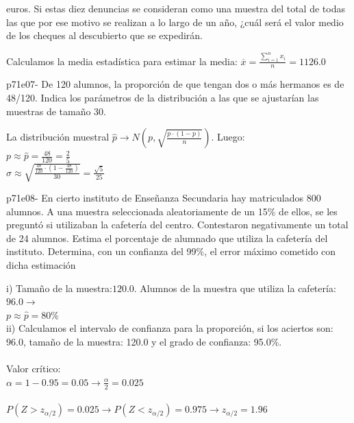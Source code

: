 \documentclass[spanish, 11pt]{exam}
\begin{document}
\begin{questions}
euros. Si estas diez denuncias se consideran como una muestra del total de todas las que por ese motivo se
realizan a lo largo de un año, ¿cuál será el valor medio de los cheques al descubierto que se expedirán. \begin{solution}   Calculamos la media estadística para estimar la media: $\overline{x}=\frac{{\sum_{i=1}^n x_i }}{n} =1126.0$ \\   \end{solution}\question p71e07- De 120 alumnos, la proporción de que tengan dos o más hermanos es de 48/120. Indica los parámetros de la
distribución a las que se ajustarían las muestras de tamaño 30. \begin{solution}   La distribución muestral $\widehat{p} \rightarrow N \left ( p , \sqrt{ \frac{p \cdot (1-p)} {n}}\right )$. Luego: \\ $p \approx \widehat{p}=\frac{48}{120}=\frac{2}{5}$ \\ $\sigma \approx \sqrt{\frac{\frac{48}{120}\cdot \left(1-\frac{48}{120}\right)}{30}}=\frac{\sqrt{5}}{25}$ \\    \end{solution}\question p71e08- En cierto instituto de Enseñanza Secundaria hay matriculados 800 alumnos. A una muestra seleccionada
aleatoriamente de un 15\% de ellos, se les preguntó si utilizaban la cafetería del centro. Contestaron
negativamente un total de 24 alumnos. Estima el porcentaje de alumnado que utiliza la cafetería del instituto.
Determina, con un confianza del 99\%, el error máximo cometido con dicha estimación \begin{solution}   i) Tamaño de la muestra:$120.0$. Alumnos de la muestra que utiliza la cafetería: $96.0\to $ \\ $p \approx \widehat{p} =80$\% \\ ii) Calculamos el intervalo de confianza para la proporción, si los aciertos son: 96.0, tamaño de la muestra: 120.0 y el grado de confianza: 95.0\%. \\ \\ Valor crítico: \\ $\alpha=1-0.95=0.05\to \frac{\alpha}{2}=0.025$ \\ \\ $P(Z>z_{\alpha/2})=0.025\to P(Z<z_{\alpha/2})=0.975 \to z_{\alpha/2} =1.96$ \\ 
\end{solution}
\end{questions}
\end{document}
